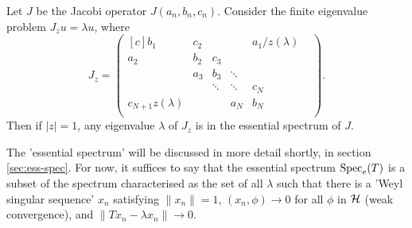 \documentclass[../main.tex]{subfiles}
\begin{document}
\begin{theorem}
  \label{thm:floquet-bloch}
  Let $J$ be the Jacobi operator $J(a_n, b_n, c_n)$. 
  Consider the finite eigenvalue problem $J_z u = \lambda u$, where
  \begin{equation}
  \label{eqn:floquet-bloch}
    J_z =
    \begin{pmatrix*}[c]
      b_1 & c_2 & & & a_1/z(\lambda)\\
      a_2 & b_2 & c_3 & & & \\
      & a_3 & b_3 & \ddots & & \\
      & & \ddots & \ddots & c_N & \\
      c_{N+1} z(\lambda) & & & a_N & b_N\\
    \end{pmatrix*}.
  \end{equation}
Then if $|z|=1$, any eigenvalue $\lambda$ of $J_z$
is in the essential spectrum of $J$.
\end{theorem}

The 'essential spectrum' will be discussed in more detail shortly, in section \ref{sec:ess-spec}.
For now, it suffices to say that the essential spectrum $\mathrm{Spec}_e(T)$ is a subset of the spectrum
characterised as the set of all $\lambda$ such that there is a 'Weyl singular sequence'
$x_n$ satisfying $\|x_n\| = 1$, $(x_n, \phi) \rightarrow 0$ for all $\phi$ in $\mathcal{H}$
(weak convergence), and $\|Tx_n - \lambda x_n\| \rightarrow 0$.
\end{document}
